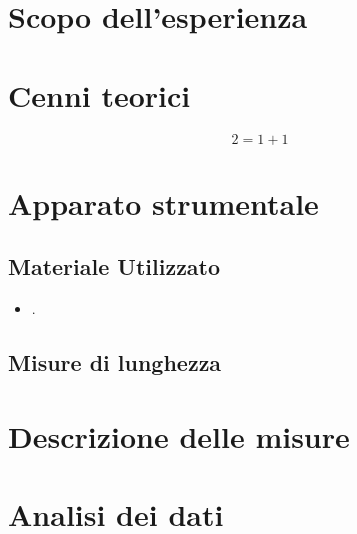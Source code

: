 \documentclass{article}
\title{}
\author{}
\date{\today}
\begin{document}
\maketitle
\section{Scopo dell'esperienza}


\section{Cenni teorici}

	\begin{equation}
		2=1+1
			\label{eq:}
	\end{equation}




 

\section{Apparato strumentale}


\subsection{Materiale Utilizzato}


\begin{itemize}

\item .


\end{itemize} 

\subsection{Misure di lunghezza}


\section{Descrizione delle misure}


\section{Analisi dei dati}
 

\end{document}
